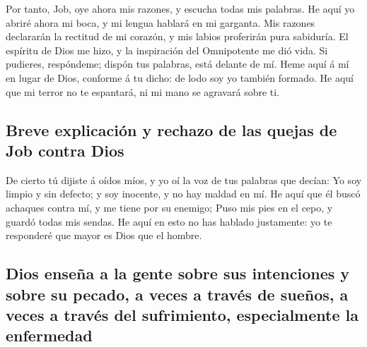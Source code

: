  Por tanto, Job, oye ahora mis razones, y escucha todas
mis palabras.  He aquí yo abriré ahora mi boca, y mi
lengua hablará en mi garganta.  Mis razones declararán la
rectitud de mi corazón, y mis labios proferirán pura sabiduría.
 El espíritu de Dios me hizo, y la inspiración del
Omnipotente me dió vida.  Si pudieres, respóndeme; dispón
tus palabras, está delante de mí.  Heme aquí á mí en lugar
de Dios, conforme á tu dicho: de lodo soy yo también formado.
 He aquí que mi terror no te espantará, ni mi mano se
agravará sobre ti.

\hypertarget{breve-explicaciuxf3n-y-rechazo-de-las-quejas-de-job-contra-dios}{%
\subsection{Breve explicación y rechazo de las quejas de Job contra
Dios}\label{breve-explicaciuxf3n-y-rechazo-de-las-quejas-de-job-contra-dios}}

 De cierto tú dijiste á oídos míos, y yo oí la voz de tus
palabras que decían:  Yo soy limpio y sin defecto; y soy
inocente, y no hay maldad en mí.  He aquí que él buscó
achaques contra mí, y me tiene por su enemigo;  Puso mis
pies en el cepo, y guardó todas mis sendas.  He aquí en
esto no has hablado justamente: yo te responderé que mayor es Dios que
el hombre.

\hypertarget{dios-enseuxf1a-a-la-gente-sobre-sus-intenciones-y-sobre-su-pecado-a-veces-a-travuxe9s-de-sueuxf1os-a-veces-a-travuxe9s-del-sufrimiento-especialmente-la-enfermedad}{%
\subsection{Dios enseña a la gente sobre sus intenciones y sobre su
pecado, a veces a través de sueños, a veces a través del sufrimiento,
especialmente la
enfermedad}\label{dios-enseuxf1a-a-la-gente-sobre-sus-intenciones-y-sobre-su-pecado-a-veces-a-travuxe9s-de-sueuxf1os-a-veces-a-travuxe9s-del-sufrimiento-especialmente-la-enfermedad}}

